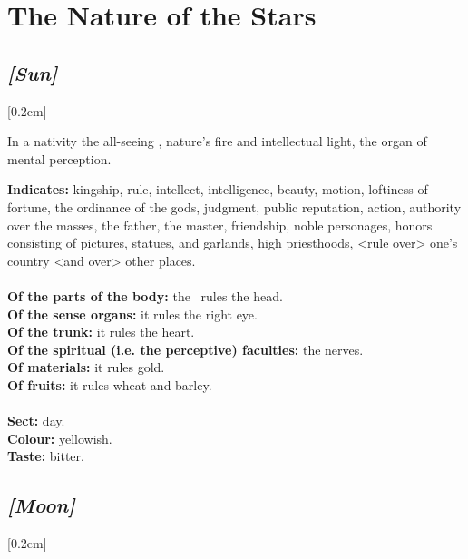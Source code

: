 
\section{The Nature of the Stars}

\subsection{\textit{[Sun]}}
[0.2cm]

In a nativity the all-seeing \Sun, nature’s fire and intellectual light, the organ of mental perception.

\textbf{Indicates:} kingship, rule, intellect, intelligence, beauty, motion, loftiness of fortune, the ordinance of the gods, judgment, public reputation, action, authority over the masses, the father, the master, friendship, noble personages, honors consisting of pictures, statues, and garlands, high priesthoods, <rule over> one’s country <and over> other places. \\
\\
\textbf{Of the parts of the body:} the \Sun\, rules the head. \\
\textbf{Of the sense organs:} it rules the right eye. \\
\textbf{Of the trunk:} it rules the heart.\\
\textbf{Of the spiritual (i.e. the perceptive) faculties:} the nerves.\\
\textbf{Of materials:} it rules gold. \\
\textbf{Of fruits:} it rules wheat and barley. \\
\\
\textbf{Sect:} day. \\
\textbf{Colour:} yellowish. \\
\textbf{Taste:} bitter.
\secbr
\subsection{\textit{[Moon]}}
[0.2cm]


